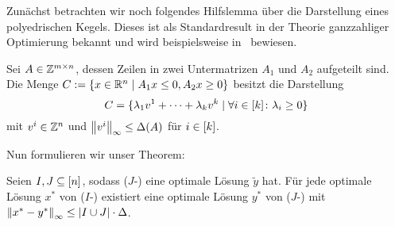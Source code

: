 Zunächst betrachten wir noch folgendes Hilfslemma über die Darstellung eines polyedrischen Kegels.
Dieses ist als Standardresult in der Theorie ganzzahliger Optimierung bekannt und wird beispielsweise in~\cite[Lemma 5.4]{Korte2012} bewiesen.
\begin{lemma}\label{lem:cone}
	Sei $A\in\mathbb{Z}^{m\times n}$, dessen Zeilen in zwei Untermatrizen $A_1$ und $A_2$ aufgeteilt sind.
	Die Menge $C:=\{ x\in\mathbb{R}^n \mid A_1x\leq 0, A_2x\geq0 \}$ besitzt die Darstellung \[ C=\{\lambda_1 v^1+\dots+\lambda_kv^k \mid \forall i\in[k] \colon\lambda_i\geq0 \}\] mit $v^i\in\mathbb{Z}^n$ und $\left\lVert v^i\right\rVert_\infty\leq\Delta(A)$ für $i\in[k]$.
\end{lemma}

Nun formulieren wir unser Theorem:

\begin{theorem}\label{thm:theo2}
	Seien $I,J\subseteq[n]$, sodass ($J$-\MIPR) eine optimale Lösung $\tilde{y}$ hat.
	Für jede optimale Lösung $x^*$ von ($I$-\MIPR) existiert eine optimale Lösung $y^*$ von ($J$-\MIPR) mit $\left\lVert x^*-y^*\right\rVert_\infty\leq\lvert I\cup J \rvert\cdot\Delta$.
\end{theorem}
